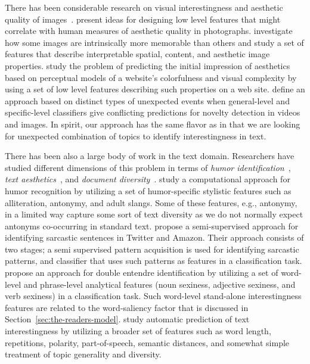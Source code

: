 There has been considerable research on visual interestingness and aesthetic quality of images~\cite{Datta:2006:SAP:2129560.2129588,Datta:2008:4233023,Ke:2006:DHF:1153170.1153495,IsolaParikhTorralbaOliva2011,dhar:2011,reinecke2013predicting,journals/pami/WeinshallZHKOABGNPHP12}. \cite{Datta:2006:SAP:2129560.2129588,Datta:2008:4233023,Ke:2006:DHF:1153170.1153495,dhar:2011} present ideas
for designing low level features that might correlate with human measures of aesthetic quality in photographs. \cite{IsolaParikhTorralbaOliva2011} investigate how some images are intrinsically more memorable than others and study a set of features that describe interpretable spatial, content, and aesthetic image properties. \cite{reinecke2013predicting,journals/pami/WeinshallZHKOABGNPHP12}  study the problem of predicting the initial impression of aesthetics
based on perceptual models of a website's colorfulness and visual complexity by using a set of low level features describing such properties on a web site.  
\cite{journals/pami/WeinshallZHKOABGNPHP12} define an approach based on distinct types of unexpected events when general-level and specific-level classifiers give conflicting predictions for novelty detection in videos and images. In spirit, our approach has the same flavor as \cite{journals/pami/WeinshallZHKOABGNPHP12}  in that we are looking for unexpected combination of topics to identify interestingness in text.

 
There has been also a large body of work in the text domain. Researchers have studied different dimensions of this problem in terms of {\em humor identification}~\cite{Mihalcea:2005:MCL:1220575.1220642,Davidov:2010:SRS:1870568.1870582,Kiddon11,labutov-lipson:2012:ACL2012short},
{\em text aesthetics}~\cite{journals:tamd:Schmidhuber10,N13-1118,ganguly:2014}, and {\em document diversity}~\cite{bache:2013}.  \cite{Mihalcea:2005:MCL:1220575.1220642} study a computational approach for humor recognition by utilizing a set of humor-specific stylistic features such as alliteration, antonymy, and adult slangs. Some of these features, e.g., antonymy, in a limited way capture some sort of text diversity as we do not normally expect antonyms co-occurring in standard text. \cite{Davidov:2010:SRS:1870568.1870582}  propose a semi-supervised approach for identifying sarcastic sentences
in Twitter and Amazon.  Their approach consists of two stages; a semi supervised pattern acquisition is used for identifying
sarcastic patterns, and classifier that uses such patterns as features in a classification task. \cite{Kiddon11} propose an approach for double entendre identification by utilizing  a set of word-level and phrase-level analytical features (noun sexiness, adjective sexiness, and verb sexiness) in a classification task. Such word-level stand-alone interestingness features are related to the word-saliency factor that is discussed in Section~\ref{sec:the-readers-model}. \cite{ganguly:2014} study automatic prediction of text interestingness by utilizing a broader set of features such as word length, repetitions, polarity, part-of-speech, semantic distances, and somewhat simple treatment of topic generality and diversity.

